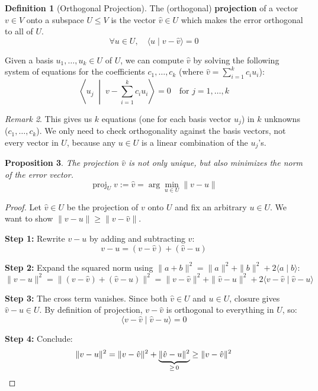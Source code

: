 \documentclass[11pt]{article}
\theoremstyle{definition}
\newtheorem{definition}{Definition}[section]
\theoremstyle{plain}
\newtheorem{proposition}[definition]{Proposition}
\theoremstyle{remark}
\newtheorem{remark}[definition]{Remark}
\DeclareMathOperator{\proj}{proj}
\begin{document}
\begin{definition}[Orthogonal Projection]
The (orthogonal) \textbf{projection} of a vector $v \in V$ onto a subspace $U \leq V$ is the vector $\hat{v} \in U$ which makes the error orthogonal to all of $U$.
\[
\forall u \in U, \quad \langle u \mid v - \hat{v} \rangle = 0
\]
\end{definition}

Given a basis $u_1, \ldots, u_k \in U$ of $U$, we can compute $\hat{v}$ by solving the following system of equations for the coefficients $c_1, \ldots, c_k$ (where $\hat{v} = \sum_{i=1}^k c_i u_i$):
\[
\left\langle u_j \;\middle|\; v - \sum_{i=1}^{k} c_i u_i \right\rangle = 0 \quad \text{for } j = 1, \ldots, k
\]

\begin{remark}
This gives us $k$ equations (one for each basis vector $u_j$) in $k$ unknowns ($c_1, \ldots, c_k$). We only need to check orthogonality against the basis vectors, not every vector in $U$, because any $u \in U$ is a linear combination of the $u_j$'s.
\end{remark}

\begin{proposition}
The projection $\hat{v}$ is not only unique, but also minimizes the norm of the error vector.
\[
\proj_U v := \hat{v} = \arg\min_{u \in U} \|v - u\|
\]
\end{proposition}

\begin{proof}
Let $\hat{v} \in U$ be the projection of $v$ onto $U$ and fix an arbitrary $u \in U$. We want to show $\|v - u\| \geq \|v - \hat{v}\|$.

\textbf{Step 1:} Rewrite $v - u$ by adding and subtracting $\hat{v}$:
\[
v - u = (v - \hat{v}) + (\hat{v} - u)
\]

\textbf{Step 2:} Expand the squared norm using $\|a + b\|^2 = \|a\|^2 + \|b\|^2 + 2\langle a \mid b \rangle$:
\[
\|v - u\|^2 = \|(v - \hat{v}) + (\hat{v} - u)\|^2 = \|v - \hat{v}\|^2 + \|\hat{v} - u\|^2 + 2\langle v - \hat{v} \mid \hat{v} - u \rangle
\]

\textbf{Step 3:} The cross term vanishes. Since both $\hat{v} \in U$ and $u \in U$, closure gives $\hat{v} - u \in U$. By definition of projection, $v - \hat{v}$ is orthogonal to everything in $U$, so:
\[
\langle v - \hat{v} \mid \hat{v} - u \rangle = 0
\]

\textbf{Step 4:} Conclude:
\[
\|v - u\|^2 = \|v - \hat{v}\|^2 + \underbrace{\|\hat{v} - u\|^2}_{\geq\, 0} \geq \|v - \hat{v}\|^2 \qedhere
\]
\end{proof}
\end{document}
